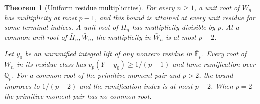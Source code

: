 \documentclass[11pt]{article}
\newtheorem{theorem}{Theorem}\newtheorem{lemma}[theorem]{Lemma}
\begin{document}
\begin{theorem}[Uniform residue multiplicities]\label{thm:residue-multiplicity}
For every $n\ge1$, a unit root of $\bar W_n$ has multiplicity at
most $p-1$, and this bound is attained at every unit residue
for some terminal indices. A unit root of $\bar H_n$ has
multiplicity divisible by $p$. At a common unit root of
$\bar H_n,\bar W_n$, the multiplicity in $\bar W_n$ is at
most $p-2$.

Let $y_0$ be an unramified integral lift of any nonzero residue
in $\overline{\mathbb F}_p$. Every root of $W_n$ in its residue
class has $v_p(Y-y_0)\ge1/(p-1)$ and tame ramification over
$\mathbb Q_p$. For a common root of the primitive moment pair
and $p>2$, the bound improves to $1/(p-2)$ and the ramification
index is at most $p-2$. When $p=2$ the primitive moment pair
has no common root.
\end{theorem}
\end{document}
